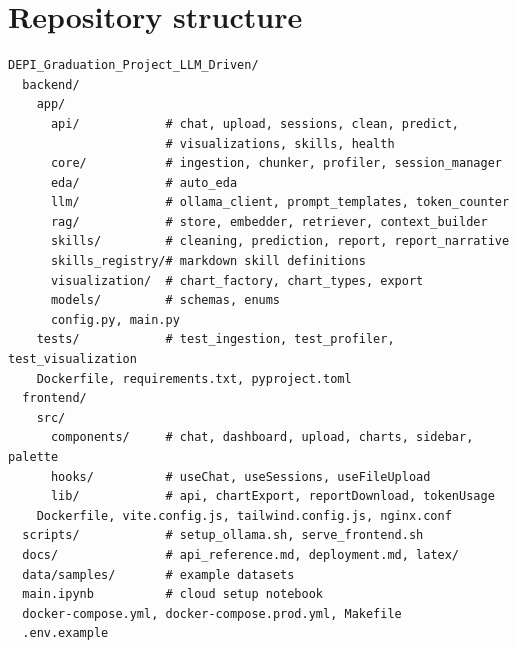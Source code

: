 \section{Repository structure}
\label{app:repo}
\begin{lstlisting}[style=bash,caption={Project layout (abridged).}]
DEPI_Graduation_Project_LLM_Driven/
  backend/
    app/
      api/            # chat, upload, sessions, clean, predict,
                      # visualizations, skills, health
      core/           # ingestion, chunker, profiler, session_manager
      eda/            # auto_eda
      llm/            # ollama_client, prompt_templates, token_counter
      rag/            # store, embedder, retriever, context_builder
      skills/         # cleaning, prediction, report, report_narrative
      skills_registry/# markdown skill definitions
      visualization/  # chart_factory, chart_types, export
      models/         # schemas, enums
      config.py, main.py
    tests/            # test_ingestion, test_profiler, test_visualization
    Dockerfile, requirements.txt, pyproject.toml
  frontend/
    src/
      components/     # chat, dashboard, upload, charts, sidebar, palette
      hooks/          # useChat, useSessions, useFileUpload
      lib/            # api, chartExport, reportDownload, tokenUsage
    Dockerfile, vite.config.js, tailwind.config.js, nginx.conf
  scripts/            # setup_ollama.sh, serve_frontend.sh
  docs/               # api_reference.md, deployment.md, latex/
  data/samples/       # example datasets
  main.ipynb          # cloud setup notebook
  docker-compose.yml, docker-compose.prod.yml, Makefile
  .env.example
\end{lstlisting}

